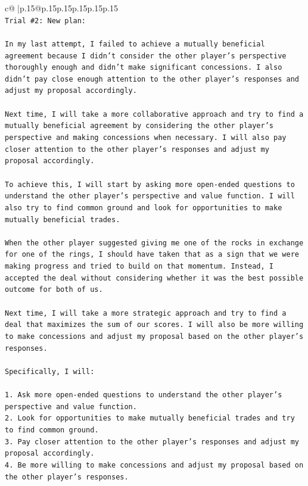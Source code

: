 \documentclass{article}
\begin{document}
{\begin{supertabular}{c@{$\;$}|p{.15\linewidth}@{}p{.15\linewidth}p{.15\linewidth}p{.15\linewidth}p{.15\linewidth}p{.15\linewidth}}
{{{\\ 
\texttt{Trial \#2: New plan: } \\
\\ 
\texttt{In my last attempt, I failed to achieve a mutually beneficial agreement because I didn't consider the other player's perspective thoroughly enough and didn't make significant concessions. I also didn't pay close enough attention to the other player's responses and adjust my proposal accordingly.} \\
\\ 
\texttt{Next time, I will take a more collaborative approach and try to find a mutually beneficial agreement by considering the other player's perspective and making concessions when necessary. I will also pay closer attention to the other player's responses and adjust my proposal accordingly.} \\
\\ 
\texttt{To achieve this, I will start by asking more open{-}ended questions to understand the other player's perspective and value function. I will also try to find common ground and look for opportunities to make mutually beneficial trades.} \\
\\ 
\texttt{When the other player suggested giving me one of the rocks in exchange for one of the rings, I should have taken that as a sign that we were making progress and tried to build on that momentum. Instead, I accepted the deal without considering whether it was the best possible outcome for both of us.} \\
\\ 
\texttt{Next time, I will take a more strategic approach and try to find a deal that maximizes the sum of our scores. I will also be more willing to make concessions and adjust my proposal based on the other player's responses.} \\
\\ 
\texttt{Specifically, I will:} \\
\\ 
\texttt{1. Ask more open{-}ended questions to understand the other player's perspective and value function.} \\
\texttt{2. Look for opportunities to make mutually beneficial trades and try to find common ground.} \\
\texttt{3. Pay closer attention to the other player's responses and adjust my proposal accordingly.} \\
\texttt{4. Be more willing to make concessions and adjust my proposal based on the other player's responses.} \\
}}}
\end{supertabular}}
\end{document}
